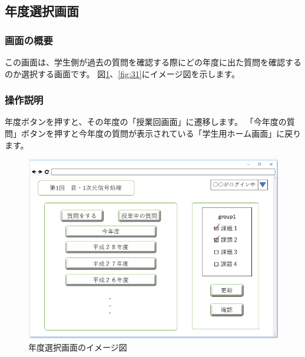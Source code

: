 \subsection{年度選択画面}
\subsubsection{画面の概要}
この画面は、学生側が過去の質問を確認する際にどの年度に出た質問を確認するのか選択する画面です。
図\ref{fig:30}、\ref{fig:31}にイメージ図を示します。

\subsubsection{操作説明}
年度ボタンを押すと、その年度の「授業回画面」に遷移します。
「今年度の質問」ボタンを押すと今年度の質問が表示されている「学生用ホーム画面」に戻ります。

\begin{figure}[phtbp]
  \begin{center}
    \includegraphics[width=1\linewidth,clip]{./img/30.png}
    \caption{年度選択画面のイメージ図}\label{fig:30}
  \end{center}
\end{figure}

